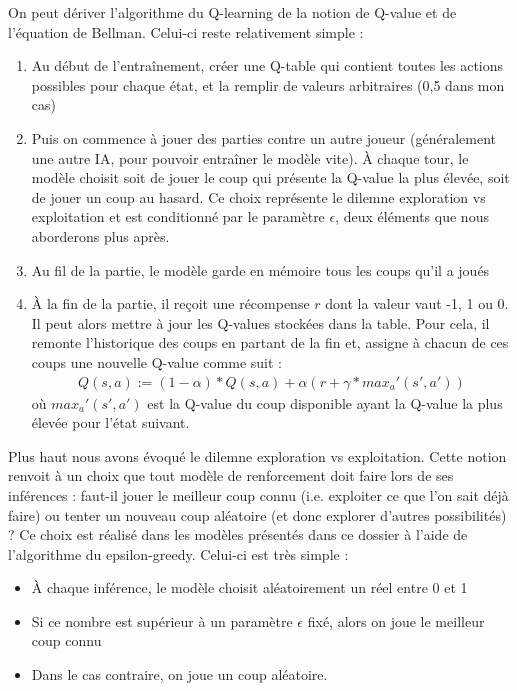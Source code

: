 \documentclass[french]{article}
\begin{document}
    On peut dériver l'algorithme du Q-learning de la notion de Q-value et de l'équation de Bellman. Celui-ci reste relativement simple :
    \begin{enumerate}
        \item Au début de l'entraînement, créer une Q-table qui contient toutes les actions possibles pour chaque état, et la remplir de valeurs arbitraires (0,5 dans mon cas)
        \item Puis on commence à jouer des parties contre un autre joueur (généralement une autre IA, pour pouvoir entraîner le modèle vite). À chaque tour, le modèle choisit soit de jouer le coup qui présente la Q-value la plus élevée, soit de jouer un coup au hasard. Ce choix représente le dilemne exploration vs exploitation et est conditionné par le paramètre $\epsilon$, deux éléments que nous aborderons plus après. 
        \item Au fil de la partie, le modèle garde en mémoire tous les coups qu'il a joués
        \item À la fin de la partie, il reçoit une récompense $r$ dont la valeur vaut -1, 1 ou 0. Il peut alors mettre à jour les Q-values stockées dans la table. Pour cela, il remonte l'historique des coups en partant de la fin et, assigne à chacun de ces coups une nouvelle Q-value comme suit :
        \begin{align*} 
            Q(s,a) := (1-\alpha)*Q(s,a) + \alpha(r + \gamma * max_a'(s',a'))
        \end{align*}
        où $max_a'(s',a')$ est la Q-value du coup disponible ayant la Q-value la plus élevée pour l'état suivant.
        
    \end{enumerate}

    Plus haut nous avons évoqué le dilemne exploration vs exploitation. Cette notion renvoit à un choix que tout modèle de renforcement doit faire lors de ses inférences : faut-il jouer le meilleur coup connu (i.e. exploiter ce que l'on sait déjà faire) ou tenter un nouveau coup aléatoire (et donc explorer d'autres possibilités) ? Ce choix est réalisé dans les modèles présentés dans ce dossier à l'aide de l'algorithme du epsilon-greedy. Celui-ci est très simple :
    \begin{itemize}
        \item À chaque inférence, le modèle choisit aléatoirement un réel entre 0 et 1
        \item Si ce nombre est supérieur à un paramètre $\epsilon$ fixé, alors on joue le meilleur coup connu
        \item Dans le cas contraire, on joue un coup aléatoire.
    \end{itemize}
\end{document}
